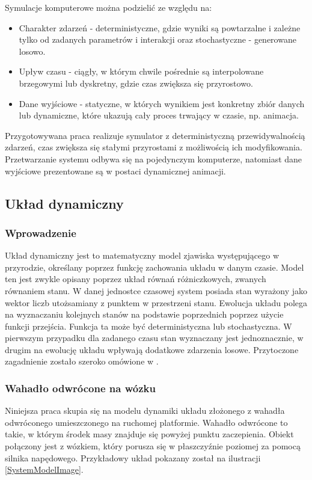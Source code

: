 \documentclass[12pt, twoside, openany]{report}
\theoremstyle{definition}
\begin{document}
\newpage
Symulacje komputerowe można podzielić ze względu na:
\begin{itemize}
\item Charakter zdarzeń - deterministyczne, gdzie wyniki są powtarzalne i zależne tylko od zadanych parametrów i interakcji oraz stochastyczne - generowane losowo. 
\item Upływ czasu - ciągły, w którym chwile pośrednie są interpolowane brzegowymi lub dyskretny, gdzie czas zwiększa się przyrostowo.
\item Dane wyjściowe - statyczne, w których wynikiem jest konkretny zbiór danych lub dynamiczne, które ukazują cały proces trwający w czasie, np. animacja.
\end{itemize}

Przygotowywana praca realizuje symulator z deterministyczną przewidywalnością zdarzeń, czas zwiększa się stałymi przyrostami z możliwością ich modyfikowania. Przetwarzanie systemu odbywa się na pojedynczym komputerze, natomiast dane wyjściowe prezentowane są w postaci dynamicznej animacji.

\subsection{Układ dynamiczny}
\subsubsection{Wprowadzenie}
Układ dynamiczny jest to matematyczny model zjawiska występującego w przyrodzie, określany poprzez funkcję zachowania układu w danym czasie. Model ten jest zwykle opisany poprzez układ równań różniczkowych, zwanych równaniem stanu. W danej jednostce czasowej system posiada stan wyrażony jako wektor liczb utożsamiany z punktem w przestrzeni stanu. Ewolucja układu polega na wyznaczaniu kolejnych stanów na podstawie poprzednich poprzez użycie funkcji przejścia. Funkcja ta może być deterministyczna lub stochastyczna. W pierwszym przypadku dla zadanego czasu stan wyznaczany jest jednoznacznie, w drugim na ewolucję układu wpływają dodatkowe zdarzenia losowe. Przytoczone zagadnienie zostało szeroko omówione w \cite{MarciniakDynamicSystems}.

\subsubsection{Wahadło odwrócone na wózku}
\label{SubsectionPendulumIntro}
Niniejsza praca skupia się na modelu dynamiki układu złożonego z wahadła odwróconego umieszczonego na ruchomej platformie. Wahadło odwrócone to takie, w którym środek masy znajduje się powyżej punktu zaczepienia. Obiekt połączony jest z wózkiem, który porusza się w płaszczyźnie poziomej za pomocą silnika napędowego. Przykładowy układ pokazany został na ilustracji \ref{SystemModelImage}.
\end{document}

